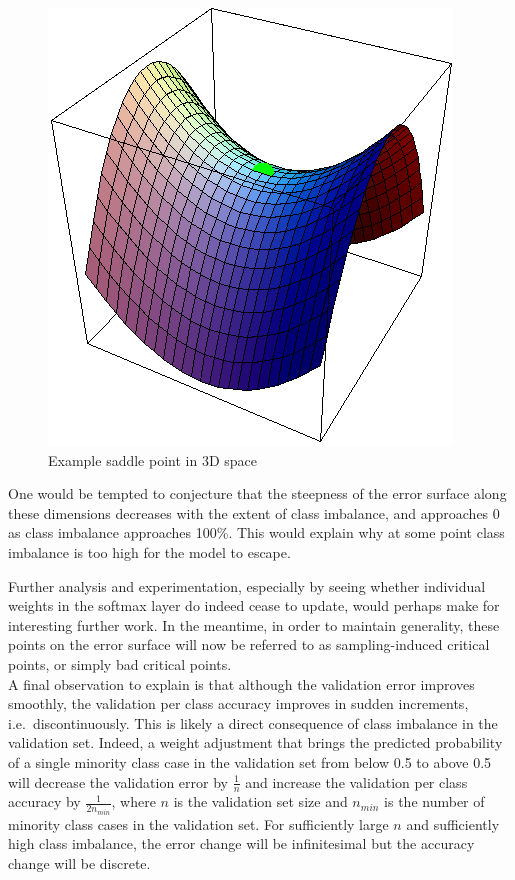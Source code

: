 \documentclass[a4paper,11pt]{article}
\begin{document}
\begin{figure}[h!]
	\centering
	\includegraphics[scale=0.4]{images/saddle_point.png}
	\caption{Example saddle point in 3D space}
\end{figure}

One would be tempted to conjecture that the steepness of the error surface along these dimensions decreases with the extent of class imbalance, and approaches 0 as class imbalance approaches 100\%. This would explain why at some point class imbalance is too high for the model to escape. 

Further analysis and experimentation, especially by seeing whether individual weights in the softmax layer do indeed cease to update, would perhaps make for interesting further work. In the meantime, in order to maintain generality, these points on the error surface will now be referred to as sampling-induced critical points, or simply bad critical points. \\

A final observation to explain is that although the validation error improves smoothly, the validation per class accuracy improves in sudden increments, i.e.\ discontinuously. This is likely a direct consequence of class imbalance in the validation set. Indeed, a weight adjustment that brings the predicted probability of a single minority class case in the validation set from below 0.5 to above 0.5 will decrease the validation error by $\frac{1}{n}$ and increase the validation per class accuracy by $\frac{1}{2n_{min}}$, where $n$ is the validation set size and $n_{min}$ is the number of minority class cases in the validation set. For sufficiently large $n$ and sufficiently high class imbalance, the error change will be infinitesimal but the accuracy change will be discrete.
\end{document}
